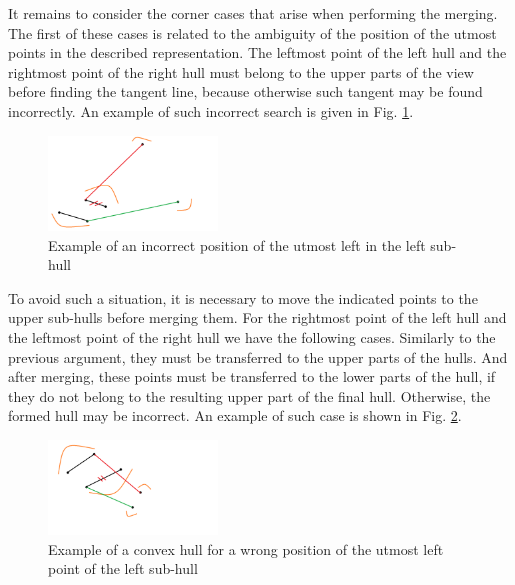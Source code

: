 \documentclass[twoside,twocolumn,10pt]{article}
\begin{document}
	It remains to consider the corner cases that arise when performing the merging. The first of these cases is related to the ambiguity of the position of the utmost points in the described representation. The leftmost point of the left hull and the rightmost point of the right hull must belong to the upper parts of the view before finding the tangent line, because otherwise such tangent may be found incorrectly. An example of such incorrect search is given in Fig. \ref{fig:incorect_search}.
	
	\begin{figure}[t]
		\centering
		\includegraphics[width=0.4\textwidth, height=0.2\textheight]{incorect_search}
		\caption{Example of an incorrect position of the utmost left in the left sub-hull}
		\label{fig:incorect_search}
	\end{figure}
	
	To avoid such a situation, it is necessary to move the indicated points to the upper sub-hulls before merging them. For the rightmost point of the left hull and the leftmost point of the right hull we have the following cases. Similarly to the previous argument, they must be transferred to the upper parts of the hulls. And after merging, these points must be transferred to the lower parts of the hull, if they do not belong to the resulting upper part of the final hull. Otherwise, the formed hull may be incorrect. An example of such case is shown in Fig. \ref{fig:incorect_edge_points}.
	
	
	\begin{figure}[t]
		\centering
		\includegraphics[width=0.4\textwidth, height=0.2\textheight]{incorect_edge_points}
		\caption{Example of a convex hull for a wrong position of the utmost left point of the left sub-hull}
		\label{fig:incorect_edge_points}
	\end{figure}
	
\end{document}

